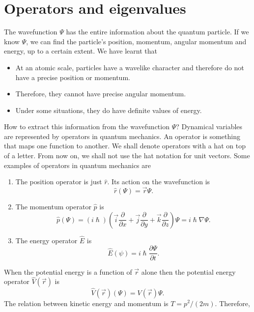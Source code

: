 \section{Operators and eigenvalues}\label{c4s3}
The wavefunction $\Psi$ has the entire information about the quantum particle.
If we know $\Psi$, we can find the particle's position, momentum, angular 
momentum and energy, up to a certain extent. We have learnt that 
\begin{itemize}
\item At an atomic scale, particles have a wavelike character and therefore
do not have a precise position or momentum.
\item Therefore, they cannot have precise angular momentum.
\item Under some situations, they do have definite values of energy.
\end{itemize}
How to extract this information from the wavefunction $\Psi$? Dynamical 
variables are represented by operators in quantum mechanics. An operator is
something that maps one function to another. We shall denote operators with
a hat on top of a letter. From now on, we shall not use the hat notation for
unit vectors. Some examples of operators in
quantum mechanics are
\begin{enumerate}
\item The position operator is just $\hat{r}$. Its action on the wavefunction is
\begin{equation}\label{c4e3e1}
\hat{r}(\Psi) = \vec{r}\Psi.
\end{equation}
\item The momentum operator $\hat{p}$ is
\begin{equation}\label{c4s3e2}
\hat{p}(\Psi) = (i\hslash)\left(\vec{i}\frac{\partial}{\partial x} + 
\vec{j}\frac{\partial}{\partial y} + \vec{k}\frac{\partial}{\partial z}
\right)\Psi
= i\hslash\nabla\Psi.
\end{equation}
\item The energy operator $\hat{E}$ is
\begin{equation}\label{c4s3e3}
\hat{E}(\psi) = i\hslash\frac{\partial\Psi}{\partial t}.
\end{equation}
\end{enumerate}
When the potential energy is a function of $\vec{r}$ alone then the potential
energy operator $\hat{V}(\vec{r})$ is
\begin{equation}\label{c4s3e4}
\hat{V}(\vec{r})(\Psi) = V(\vec{r})\Psi.
\end{equation}
The relation between kinetic energy and momentum is $T = p^2/(2m)$. Therefore,
